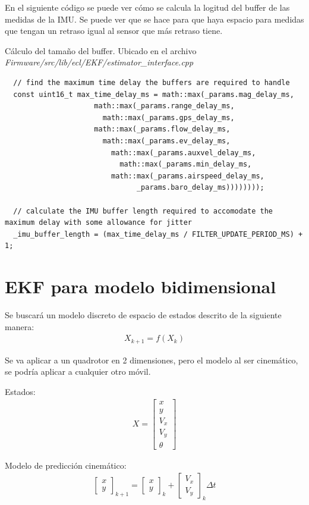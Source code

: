 En el siguiente código se puede ver cómo se calcula la logitud del buffer de las medidas de la IMU. Se puede ver que se hace para que haya espacio para medidas que tengan un retraso igual al sensor que más retraso tiene.
\begin{codigo}{Cálculo del tamaño del buffer. Ubicado en el archivo \textit{Firmware/src/lib/ecl/EKF/estimator\_interface.cpp}}
\begin{verbatim}
  // find the maximum time delay the buffers are required to handle
  const uint16_t max_time_delay_ms = math::max(_params.mag_delay_ms,
  				     math::max(_params.range_delay_ms,
  				       math::max(_params.gps_delay_ms,
  					 math::max(_params.flow_delay_ms,
  					   math::max(_params.ev_delay_ms,
  					     math::max(_params.auxvel_delay_ms,
  					       math::max(_params.min_delay_ms,
  						 math::max(_params.airspeed_delay_ms,
  						       _params.baro_delay_ms))))))));
  
  // calculate the IMU buffer length required to accomodate the maximum delay with some allowance for jitter
  _imu_buffer_length = (max_time_delay_ms / FILTER_UPDATE_PERIOD_MS) + 1;
\end{verbatim}
\end{codigo} 


\section{EKF para modelo bidimensional}
Se buscará un modelo discreto de espacio de estados descrito de la siguiente manera:
\begin{align}
X_{k+1} =  f(X_k)
\end{align}

Se va aplicar a un quadrotor en 2 dimensiones, pero el modelo al ser cinemático, se podría aplicar a cualquier otro móvil.

Estados:
\begin{align}
X = 
\begin{bmatrix} 
x \\ y \\ V_x \\ V_y \\ \theta
\end{bmatrix}
\end{align}

Modelo de predicción cinemático:
\begin{align}
\begin{bmatrix} 
x \\ y 
\end{bmatrix}_{k+1}
=
\begin{bmatrix} 
x \\ y 
\end{bmatrix}_k
+
\begin{bmatrix} 
V_x \\ V_y 
\end{bmatrix}_k
\Delta t
\end{align}

